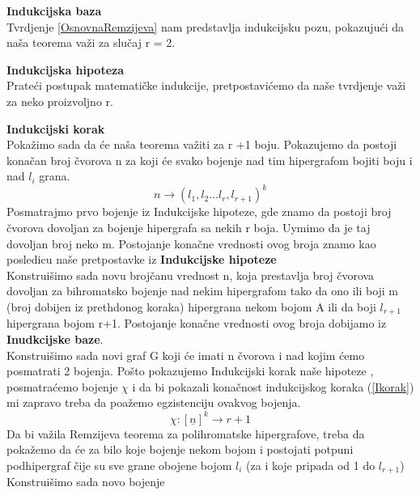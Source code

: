 \documentclass[a4paper]{article}
\begin{document}
	\begin{description}
		\item \textbf{Indukcijska baza} \\
		Tvrdjenje \ref{OsnovnaRemzijeva} nam predstavlja indukcijsku pozu, pokazujući da naša teorema važi za slučaj r = 2.\\
		\item \textbf{Indukcijska hipoteza}\\
		Prateći postupak matematičke indukcije, pretpostavićemo da naše tvrdjenje važi za neko proizvoljno r.\\
		\item \textbf{Indukcijski korak}\\
		Pokažimo sada da će naša teorema važiti za r +1 boju.
		Pokazujemo da postoji konačan broj čvorova n za koji će svako bojenje nad tim hipergrafom bojiti boju i nad $l_i$ grana. %
		\begin{equation}\label{Ikorak}
		 n \rightarrow (l_1, l_2 \dots l_r, l_{r+1})^k
		\end{equation}
		Posmatrajmo prvo bojenje iz Indukcijske hipoteze, gde znamo da postoji broj čvorova dovoljan za bojenje hipergrafa sa nekih r boja. Uymimo da je taj dovoljan broj neko m. Postojanje konačne vrednosti ovog broja znamo kao posledicu naše pretpostavke iz \textbf{Indukcijske hipoteze}\\
		Konstruišimo sada novu brojčanu vrednost n, koja prestavlja broj čvorova dovoljan za bihromatsko bojenje  nad nekim hipergrafom tako da ono ili boji m (broj dobijen iz prethdonog koraka) hipergrana nekom bojom A ili da boji $l_{r+1}$ hipergrana bojom r+1. Postojanje konačne vrednosti ovog broja dobijamo iz \textbf{Inudkcijske baze}. 
		\\
		Konstruišimo sada novi graf G koji će imati n čvorova i nad kojim ćemo posmatrati 2 bojenja. Pošto pokazujemo Indukcijski korak naše hipoteze , posmatraćemo bojenje $\chi$ i da bi pokazali konačnost indukcijskog koraka (\ref{Ikorak}) mi zapravo treba da poažemo egzistenciju ovakvog bojenja.
		\begin{equation}\label{pokazujemo}
		\chi : [\underline{n}]^k \rightarrow r+1
		\end{equation}
		Da bi važila Remzijeva teorema za polihromatske hipergrafove, treba da pokažemo da će za bilo koje bojenje nekom bojom i postojati potpuni podhipergraf čije su sve grane obojene bojom $l_i$ (za i koje pripada od 1 do $l_{r+1}$) %
		Konstruišimo sada novo bojenje 
		\begin{equation}

\end{equation}
\end{description}
\end{document}
